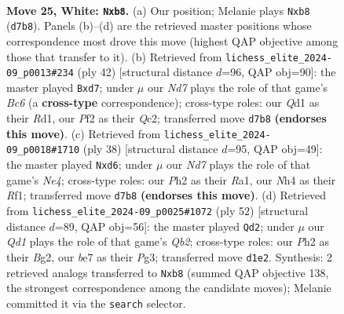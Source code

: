 \documentclass[11pt]{article}
\begin{document}
\clearpage

\begin{figure}[p]\centering
\begin{subfigure}{0.46\textwidth}\centering
\resizebox{\linewidth}{!}{%
\newchessgame
\chessboard[
  setfen={1nr5/rp1Nbpk1/p3p3/B5p1/4q2N/4P3/PP3PPP/R2QR1K1 w - - 0 25},
  showmover=false,
  pgfstyle=straightmove, color=movearrow, markmove={d7-b8}
]}
\caption{}
\end{subfigure}\hfill
\begin{subfigure}{0.46\textwidth}\centering
\resizebox{\linewidth}{!}{%
\newchessgame
\chessboard[
  setfen={1r1r2k1/p2b1pp1/1pB4p/2nPp3/2PN1q2/8/P1Q2PPP/3R1RK1 w - - 0 22},
  showmover=false,
  pgfstyle=straightmove, color=movearrow, markmove={c6-d7}
]}
\caption{}
\end{subfigure}
\\[4pt]
\begin{subfigure}{0.46\textwidth}\centering
\resizebox{\linewidth}{!}{%
\newchessgame
\chessboard[
  setfen={5rk1/p3bpp1/qp1np2p/8/3pNPP1/2P2Q2/PP5P/R4RK1 w - - 0 20},
  showmover=false,
  pgfstyle=straightmove, color=movearrow, markmove={e4-d6}
]}
\caption{}
\end{subfigure}\hfill
\begin{subfigure}{0.46\textwidth}\centering
\resizebox{\linewidth}{!}{%
\newchessgame
\chessboard[
  setfen={4r3/pp3rpk/2b2n1p/2qN1p2/2PR3P/6P1/PQ3PB1/2R3K1 w - - 1 27},
  showmover=false,
  pgfstyle=straightmove, color=movearrow, markmove={b2-d2}
]}
\caption{}
\end{subfigure}
\caption{\textbf{Move 25, White: \texttt{Nxb8}.} (a) Our position; Melanie plays \texttt{Nxb8} (\texttt{d7b8}). Panels (b)--(d) are the retrieved master positions whose correspondence most drove this move (highest QAP objective among those that transfer to it). (b) Retrieved from \texttt{lichess\_elite\_2024-09\_p0013\#234} (ply 42) [structural distance $d$=96, QAP obj=90]: the master played \texttt{Bxd7}; under $\mu$ our \emph{Nd7} plays the role of that game's \emph{Bc6} (a \textbf{cross-type} correspondence); cross-type roles: our \emph{Q}d1 as their \emph{R}d1, our \emph{P}f2 as their \emph{Q}c2; transferred move \texttt{d7b8} \textbf{(endorses this move)}. (c) Retrieved from \texttt{lichess\_elite\_2024-09\_p0018\#1710} (ply 38) [structural distance $d$=95, QAP obj=49]: the master played \texttt{Nxd6}; under $\mu$ our \emph{Nd7} plays the role of that game's \emph{Ne4}; cross-type roles: our \emph{P}h2 as their \emph{R}a1, our \emph{N}h4 as their \emph{R}f1; transferred move \texttt{d7b8} \textbf{(endorses this move)}. (d) Retrieved from \texttt{lichess\_elite\_2024-09\_p0025\#1072} (ply 52) [structural distance $d$=89, QAP obj=56]: the master played \texttt{Qd2}; under $\mu$ our \emph{Qd1} plays the role of that game's \emph{Qb2}; cross-type roles: our \emph{P}h2 as their \emph{B}g2, our \emph{b}e7 as their \emph{P}g3; transferred move \texttt{d1e2}. Synthesis: 2 retrieved analogs transferred to \texttt{Nxb8} (summed QAP objective 138, the strongest correspondence among the candidate moves); Melanie committed it via the \texttt{search} selector.}
\label{fig:thought-m48}
\end{figure}
\end{document}
